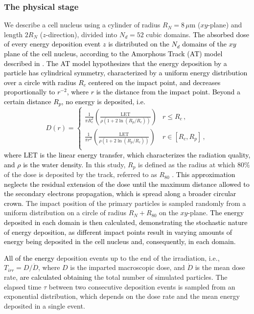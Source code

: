 \documentclass[10pt]{iopart}
\newcommand{\marco}[1]{\textcolor{black}{#1}}
\newcommand{\fra}[1]{\textcolor{black}{#1}}
\newcommand{\ema}[1]{\textcolor{black}{#1}}
\numberwithin{table}{section}
\begin{document}
\subsubsection*{The physical stage}\label{SEC:PhysS}

We describe a cell nucleus using a cylinder of radius $R_N = 8\,\mu$m ($xy$-plane) and length $2 R_N$ ($z$-direction), divided into $N_d = 52$ cubic domains. \fra{The absorbed dose of every energy deposition event $z$ is distributed on the $N_d$ domains of the $ xy$ plane of the cell nucleus, according to the Amorphous Track (AT) model described in \cite{Scholz1996}. The AT model hypothesizes that the energy deposition by a particle has \ema{cylindrical} symmetry, characterized by a uniform energy distribution over a circle with radius $R_c$ centered on the impact point, and decreases proportionally to $r^{-2}$, where $r$ is the distance from the impact point. Beyond a certain distance $R_p$, no energy is deposited, i.e.}
\begin{equation}\label{EQN:DcDp}
D(r) =
\begin{cases}
\frac{1}{\pi R_c^2} \left( \frac{\mathrm{LET}}{\rho \left( 1 + 2 \ln \left( R_p/R_c \right) \right)} \right) & r \leq R_c\,,\\
\frac{1}{\pi r^2} \left( \frac{\mathrm{LET}}{\rho \left( 1 + 2 \ln \left( R_p/R_c \right) \right)} \right) & r \in [R_c,R_p]\,,\\
\end{cases}
\end{equation}
\marco{where $\mathrm{LET}$ is the linear energy transfer, which characterizes the radiation quality, and $\rho$ is the water density.} In this study, $R_p$ is defined as the radius at which $80\%$ of the dose is deposited by the track, referred to as $R_{80}$ \cite{Weber2022, Battestini2023}. \ema{This approximation neglects the residual extension of the dose until the maximum distance allowed to the secondary electrons propagation, which is spread along a broader circular crown}. The impact position of the primary particles is sampled randomly from a uniform distribution on a circle of radius $R_N + R_{80}$ on the $xy$-plane. \fra{The energy deposited in each domain is then calculated, demonstrating the stochastic nature of energy deposition, as different impact points result in varying amounts of energy being deposited in the cell nucleus and, consequently, in each domain.}

\fra{All of the energy} deposition events up to the end of the irradiation, i.e., $T_{irr} = D / \dot{D}$, where $D$ is the imparted macroscopic dose, and $\dot{D}$ is the mean dose rate, \fra{are calculated obtaining} the total number of simulated particles. The elapsed time $\tau$ between two consecutive deposition events is sampled from an exponential distribution, which depends on the dose rate and the mean energy deposited in a single event.
\end{document}
